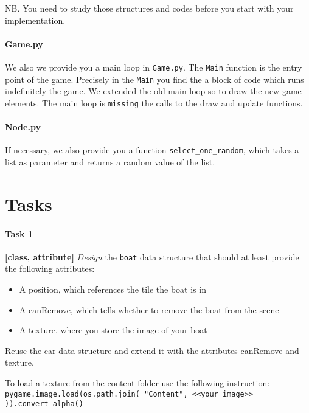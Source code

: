 \documentclass[10pt,a4paper]{article}
\begin{document}
\noindent
NB. You need to study those structures and codes before you start with your implementation. 
	
\paragraph{Game.py}


We also we provide you a main loop in \texttt{Game.py}. The \texttt{Main} function is the entry point of the game. Precisely in the \texttt{Main} you find the a block of code which runs indefinitely the game. We extended the old main loop so to draw the new game elements. The main loop is \texttt{missing} the calls to the draw and update functions.

\paragraph{Node.py}


If necessary, we also provide you a function \texttt{select\_one\_random}, which takes a list as parameter and returns a random value of the list.

\section{Tasks}	

\paragraph{Task 1} \textbf{[class, attribute]} \textit{Design} the \texttt{boat} data structure that should at least provide the following attributes:
\begin{itemize}[noitemsep,nolistsep]
	\item A position, which references the tile the boat is in
	\item A canRemove, which tells whether to remove the boat from the scene
	\item A texture, where you store the image of your boat
\end{itemize}
Reuse the car data structure and extend it with the attributes canRemove and texture. 


To load a texture from the content folder use the following instruction: \\
\texttt{pygame.image.load(os.path.join( "Content", <<your\_image>> )).convert\_alpha()}
\end{document}
